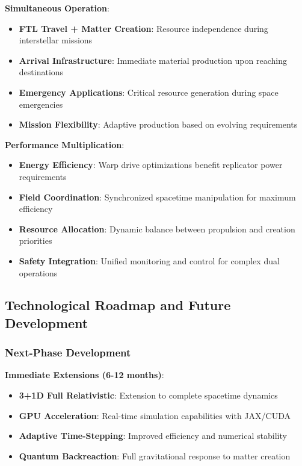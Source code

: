 \documentclass[11pt]{article}
\begin{document}
\textbf{Simultaneous Operation}:
\begin{itemize}
\item \textbf{FTL Travel + Matter Creation}: Resource independence during interstellar missions
\item \textbf{Arrival Infrastructure}: Immediate material production upon reaching destinations
\item \textbf{Emergency Applications}: Critical resource generation during space emergencies
\item \textbf{Mission Flexibility}: Adaptive production based on evolving requirements
\end{itemize}

\textbf{Performance Multiplication}:
\begin{itemize}
\item \textbf{Energy Efficiency}: Warp drive optimizations benefit replicator power requirements
\item \textbf{Field Coordination}: Synchronized spacetime manipulation for maximum efficiency
\item \textbf{Resource Allocation}: Dynamic balance between propulsion and creation priorities
\item \textbf{Safety Integration}: Unified monitoring and control for complex dual operations
\end{itemize}

\subsection{Technological Roadmap and Future Development}

\subsubsection{Next-Phase Development}

\textbf{Immediate Extensions (6-12 months)}:
\begin{itemize}
\item \textbf{3+1D Full Relativistic}: Extension to complete spacetime dynamics
\item \textbf{GPU Acceleration}: Real-time simulation capabilities with JAX/CUDA
\item \textbf{Adaptive Time-Stepping}: Improved efficiency and numerical stability
\item \textbf{Quantum Backreaction}: Full gravitational response to matter creation
\end{itemize}
\end{document}

